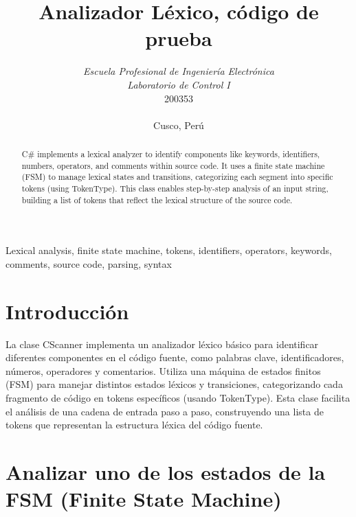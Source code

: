 \documentclass[conference]{IEEEtran}
\begin{document}
	
	\title{Analizador Léxico, código de prueba}
	\author{	
		\textit{Escuela Profesional de Ingeniería Electrónica}\\
		\textit{Laboratorio de Control I}\\
		200353 \\\\
		Cusco, Perú
	}
	
	\maketitle
	
	\begin{abstract}
		C\# implements a lexical analyzer to identify components like keywords, identifiers, numbers, operators, and comments within source code. It uses a finite state machine (FSM) to manage lexical states and transitions, categorizing each segment into specific tokens (using TokenType). This class enables step-by-step analysis of an input string, building a list of tokens that reflect the lexical structure of the source code.
	\end{abstract}
	
	\begin{IEEEkeywords}
		Lexical analysis, finite state machine, tokens, identifiers, operators, keywords, comments, source code, parsing, syntax
	\end{IEEEkeywords}
	
	\section{Introducción}
	La clase CScanner implementa un analizador léxico básico para identificar diferentes componentes en el código fuente, como palabras clave, identificadores, números, operadores y comentarios. Utiliza una máquina de estados finitos (FSM) para manejar distintos estados léxicos y transiciones, categorizando cada fragmento de código en tokens específicos (usando TokenType). Esta clase facilita el análisis de una cadena de entrada paso a paso, construyendo una lista de tokens que representan la estructura léxica del código fuente.
	
	\section{Analizar uno de los estados de la FSM (Finite State Machine)}
	
\end{document}
